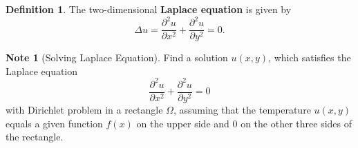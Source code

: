 \documentclass[12pt,openany]{book}
\theoremstyle{definition}
\newtheorem{definition}{Definition}[chapter]
\newtheorem*{note}{Note}
\begin{document}
	\newpage
	
	\begin{tcolorbox}[colframe=defcolor, title={\color{white}\bf Laplace Equation}]
		\begin{definition}
			The two-dimensional \textbf{Laplace equation} is given by
			\[
			\Delta u = \frac{\partial^2 u}{\partial x^2} + \frac{\partial^2 u}{\partial y^2} = 0.
			\]
		\end{definition}
	\end{tcolorbox}
	\begin{note}[Solving Laplace Equation]
		Find a solution \( u(x, y) \), which satisfies the Laplace equation
		\[
		\frac{\partial^2 u}{\partial x^2} + \frac{\partial^2 u}{\partial y^2} = 0
		\]
		with Dirichlet problem in a rectangle \( \Omega \), assuming that the temperature \( u(x, y) \) equals a given function \( f(x) \) on the upper side and 0 on the other three sides of the rectangle.
		\begin{figure}[h!]\centering
\end{figure}
\end{note}
\end{document}
